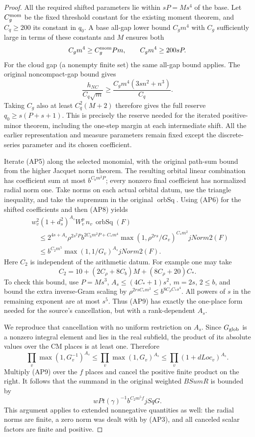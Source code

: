 \begin{proof}
All the required shifted parameters lie within
\(sP=M s^4\) of the base. Let \(C_g^{\rm mom}\)
be the fixed threshold constant for the existing
moment theorem, and \(C_q\ge200\) its constant in
\(q_0\). A base all-gap lower bound \(C_gm^4\)
with \(C_g\) sufficiently large in terms of these
constants and \(M\) ensures both
\[
 C_gm^4\ge C_g^{\rm mom} P m,\qquad
 C_gm^4\ge200sP.
\]
For the cloud gap (a nonempty finite set) the
same all-gap bound applies. The original
noncompact-gap bound gives
\[
 \frac{h_{NC}}{C_q\sqrt m}
 \ge \frac{C_g m^4(3sn^2+n^3)}{C_q}.
\]
Taking \(C_g\) also at least \(C_q^2(M+2)\)
therefore gives the full reserve
\(q_0\ge s(P+s+1)\). This is precisely the reserve
needed for the iterated positive-minor theorem,
including the one-step margin at each intermediate
shift. All the earlier representation and measure
parameters remain fixed except the discrete-series
parameter and its chosen coefficient.

Iterate (AP5) along the selected monomial, with
the original path-sum bound from the higher
Jacquet norm theorem. The resulting orbital
linear combination has coefficient sum at most
\(b^{C_bm^2P}\); every nonzero final coefficient
has normalized radial norm one. Take norms on
each actual orbital datum, use the triangle
inequality, and take the supremum in the original
\(\operatorname{orbSq}\). Using (AP6) for the
shifted coefficients and then (AP8) yields
\[
 \begin{split}
 &w_v^2(1+d_s^2)^{A_s}W_v^p\,
           n_v\,\operatorname{orbSq}(F)\\
 &\quad\le
   2^{4s+A_s}\rho^{2s^2P}
       b^{2C_bm^2P+C_*m^4}
       \max(1,\rho^{2rs}/G_v)^{C_*m^2}jNorm2(F)\\
 &\quad\le b^{C_2m^5}\max(1,1/G_v)^{A_s}jNorm2(F).
 \end{split}
 \tag{AP9}
\]
Here \(C_2\) is independent of the arithmetic datum.
For example one may take
\[
 C_2=10+(2C_\rho+8C_b)M
                  +(8C_\rho+20)C_* .
\]
To check this bound, use \(P=Ms^3\),
\(A_s\le(4C_*+1)s^2\), \(m=2s\), \(2\le b\),
and bound the extra inverse-Gram scaling by
\(\rho^{2rs C_*m^2}\le b^{8C_\rho C_*s^4}\).
All powers of \(s\) in the remaining exponent
are at most \(s^5\). Thus (AP9) has exactly the
one-place form needed for the source's cancellation,
but with a rank-dependent \(A_s\).

We reproduce that cancellation with no uniform
restriction on \(A_s\). Since \(G_{\rm glob}\) is
a nonzero integral element and lies in the real
subfield, the product of its absolute values over
the CM places is at least one. Therefore
\[
 \prod_v\max(1,G_v^{-1})^{A_s}
 \le\prod_v\max(1,G_v)^{A_s}
 \le\prod_v(1+dLoc_v)^{A_s}.
\]
Multiply (AP9) over the \(f\) places and cancel the
positive finite product on the right. It follows
that the summand in the original weighted \(BSumR\)
is bounded by
\[
    wPt(\gamma)^{-1} b^{C_2m^5 f}jSqG.                 \tag{AP10}
\]
This argument applies to extended nonnegative
quantities as well: the radial norms are finite,
a zero norm was dealt with by (AP3), and all
canceled scalar factors are finite and positive.


\end{proof}
